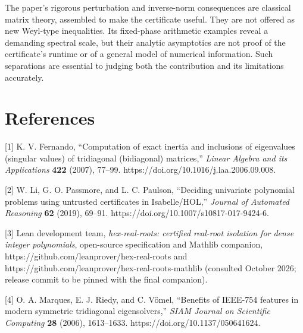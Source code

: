 \documentclass[
  11pt,
]{article}
\begin{document}
The paper's rigorous perturbation and inverse-norm consequences are
classical matrix theory, assembled to make the certificate useful. They
are not offered as new Weyl-type inequalities. Its fixed-phase
arithmetic examples reveal a demanding spectral scale, but their
analytic asymptotics are not proof of the certificate's runtime or of a
general model of numerical information. Such separations are essential
to judging both the contribution and its limitations accurately.

\section{References}\label{references}

{[}1{]} K. V. Fernando, ``Computation of exact inertia and inclusions of
eigenvalues (singular values) of tridiagonal (bidiagonal) matrices,''
\emph{Linear Algebra and its Applications} \textbf{422} (2007), 77--99.
https://doi.org/10.1016/j.laa.2006.09.008.

{[}2{]} W. Li, G. O. Passmore, and L. C. Paulson, ``Deciding univariate
polynomial problems using untrusted certificates in Isabelle/HOL,''
\emph{Journal of Automated Reasoning} \textbf{62} (2019), 69--91.
https://doi.org/10.1007/s10817-017-9424-6.

{[}3{]} Lean development team, \emph{hex-real-roots: certified real-root
isolation for dense integer polynomials}, open-source specification and
Mathlib companion, https://github.com/leanprover/hex-real-roots and
https://github.com/leanprover/hex-real-roots-mathlib (consulted October
2026; release commit to be pinned with the final companion).

{[}4{]} O. A. Marques, E. J. Riedy, and C. Vömel, ``Benefits of IEEE-754
features in modern symmetric tridiagonal eigensolvers,'' \emph{SIAM
Journal on Scientific Computing} \textbf{28} (2006), 1613--1633.
https://doi.org/10.1137/050641624.
\end{document}
